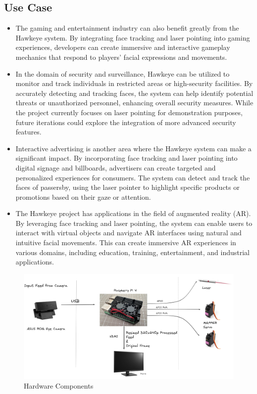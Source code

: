 \documentclass[a4paper,11pt]{article}%
\begin{document}
\subsection{Use Case}
\begin{itemize}
    \item The gaming and entertainment industry can also benefit greatly from the Hawkeye system. By integrating face tracking and laser pointing into gaming experiences, developers can create immersive and interactive gameplay mechanics that respond to players' facial expressions and movements.
    \item In the domain of security and surveillance, Hawkeye can be utilized to monitor and track individuals in restricted areas or high-security facilities. By accurately detecting and tracking faces, the system can help identify potential threats or unauthorized personnel, enhancing overall security measures. While the project currently focuses on laser pointing for demonstration purposes, future iterations could explore the integration of more advanced security features.
    \item Interactive advertising is another area where the Hawkeye system can make a significant impact. By incorporating face tracking and laser pointing into digital signage and billboards, advertisers can create targeted and personalized experiences for consumers. The system can detect and track the faces of passersby, using the laser pointer to highlight specific products or promotions based on their gaze or attention.
    \item The Hawkeye project has applications in the field of augmented reality (AR). By leveraging face tracking and laser pointing, the system can enable users to interact with virtual objects and navigate AR interfaces using natural and intuitive facial movements. This can create immersive AR experiences in various domains, including education, training, entertainment, and industrial applications.
\end{itemize}

\begin{figure}[H]
    \centering
    \includegraphics[scale=0.1]{figures/hw_overview.png}
    \caption{Hardware Components}
\end{figure}
\end{document}
